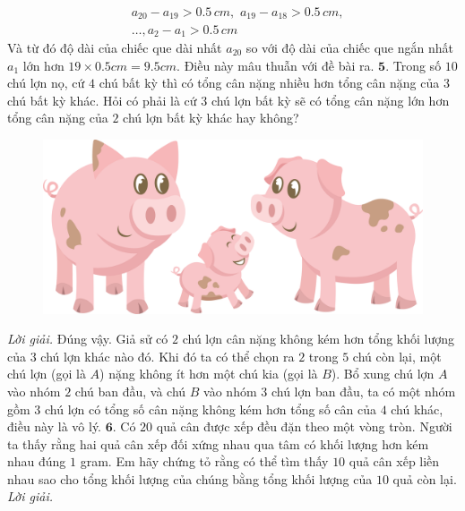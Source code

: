 \begin{multicols}{2}
	\begin{align*}
		&a_{20} - a_{19} > 0{.}5\,cm,\,\, a_{19} - a_{18} > 0{.}5 \,cm,\\
		&\ldots, a_{2} - a_{1} > 0{.}5 \,cm	
	\end{align*}
	Và từ đó độ dài của chiếc que dài nhất $a_{20}$ so với độ dài của chiếc que ngắn nhất $a_1$ lớn hơn $19 \times 0{.}5 cm = 9{.}5 cm$. Điều này mâu thuẫn với đề bài ra.
	\vskip 0.1cm
	$\pmb{5.}$ Trong số $10$ chú lợn nọ, cứ $4$ chú bất kỳ thì có tổng cân nặng nhiều hơn tổng cân nặng của $3$ chú bất kỳ khác. Hỏi có phải là cứ $3$ chú lợn bất kỳ sẽ có tổng cân nặng lớn hơn tổng cân nặng của $2$ chú lợn bất kỳ khác hay không?
	\begin{figure}[H]
		\centering
		\vspace*{-5pt}
		\captionsetup{labelformat= empty, justification=centering}
		\includegraphics[width=0.8\linewidth]{Pi3_Bai5}
		\vspace*{-10pt}
	\end{figure}
	\textit{Lời giải.} 	Đúng vậy. Giả sử có $2$ chú lợn cân nặng không kém hơn tổng khối lượng của $3$ chú lợn khác nào đó. Khi đó ta có thể chọn ra $2$ trong $5$ chú còn lại, một chú lợn (gọi là $A$) nặng không ít hơn một chú kia (gọi là $B$). Bổ xung chú lợn $A$ vào nhóm $2$ chú ban đầu, và chú $B$ vào nhóm $3$ chú lợn ban đầu, ta có một nhóm gồm $3$ chú lợn có tổng số cân nặng không kém hơn tổng số cân của $4$ chú khác, điều này là vô lý.
	\vskip 0.1cm
	$\pmb{6.}$ Có $20$ quả cân được xếp đều đặn theo một vòng tròn. Người ta thấy rằng hai quả cân xếp đối xứng nhau qua tâm có khối lượng hơn kém nhau đúng $1$ gram. Em hãy chứng tỏ rằng có thể tìm thấy $10$ quả cân xếp liền nhau sao cho tổng khối lượng của chúng bằng tổng khối lượng của $10$ quả còn lại.
	\vskip 0.1cm
	\textit{Lời giải.}

\end{multicols}
